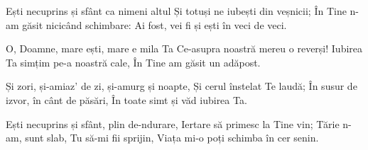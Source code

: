 \beginverse
Ești necuprins și sfânt ca nimeni altul
Și totuși ne iubești din veșnicii;
În Tine n-am găsit nicicând schimbare:
Ai fost, vei fi și ești în veci de veci.
\endverse

\beginchorus
O, Doamne, mare ești, mare e mila Ta
Ce-asupra noastră mereu o reverși!
Iubirea Ta simțim pe-a noastră cale,
În Tine am găsit un adăpost.
\endchorus

\beginverse
Și zori, și-amiaz' de zi, și-amurg și noapte,
Și cerul înstelat Te laudă;
În susur de izvor, în cânt de păsări,
În toate simt și văd iubirea Ta.
\endverse

\beginverse
Ești necuprins și sfânt, plin de-ndurare,
Iertare să primesc la Tine vin;
Tărie n-am, sunt slab, Tu să-mi fii sprijin,
Viața mi-o poți schimba în cer senin.
\endverse
\endsong